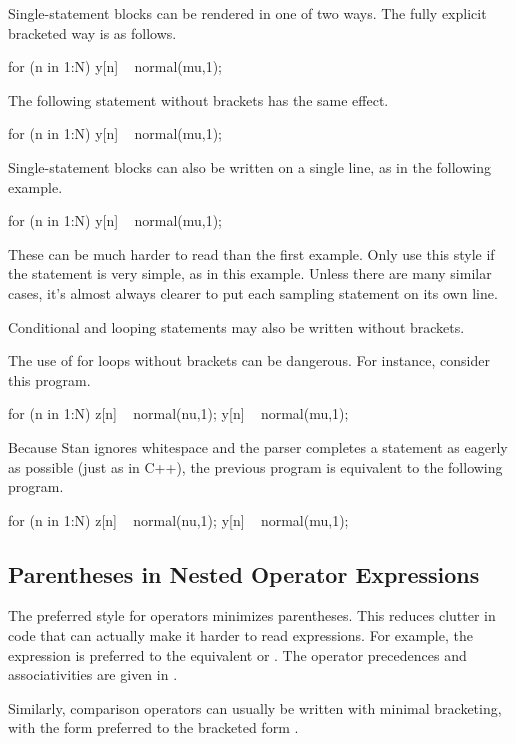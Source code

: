 Single-statement blocks can be rendered in one of two ways.  The fully
explicit bracketed way is as follows.
%
\begin{stancode}
for (n in 1:N) {
  y[n] ~ normal(mu,1);
}
\end{stancode}
%
The following statement without brackets has the same effect.
%
\begin{stancode}
for (n in 1:N)
  y[n] ~ normal(mu,1);
\end{stancode}
%
Single-statement blocks can also be written on a single line, as
in the following example.
%
\begin{stancode}
for (n in 1:N) y[n] ~ normal(mu,1);
\end{stancode}
%
These can be much harder to read than the first example. Only use this
style if the statement is very simple, as in this example.  Unless
there are many similar cases, it's almost always clearer to put
each sampling statement on its own line.

Conditional and looping statements may also be written without brackets.

The use of for loops without brackets can be dangerous.  For instance,
consider this program.
%
\begin{stancode}
for (n in 1:N)
  z[n] ~ normal(nu,1);
  y[n] ~ normal(mu,1);
\end{stancode}
%
Because Stan ignores whitespace and the parser completes a statement
as eagerly as possible (just as in C++), the previous program is
equivalent to the following program.
%
\begin{stancode}
for (n in 1:N) {
  z[n] ~ normal(nu,1);
}
y[n] ~ normal(mu,1);
\end{stancode}
%


\subsection{Parentheses in Nested Operator Expressions}

The preferred style for operators minimizes parentheses.  This reduces
clutter in code that can actually make it harder to read expressions.
For example, the expression  is preferred to the
equivalent  or .  The operator
precedences and associativities are given in
.

Similarly, comparison operators can usually be written with minimal
bracketing, with the form  preferred to
the bracketed form .

